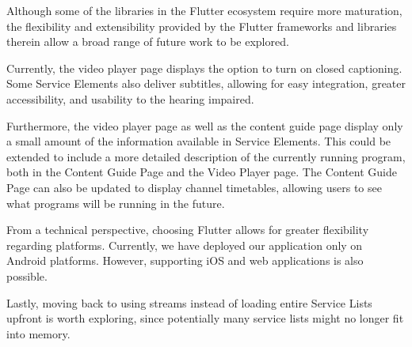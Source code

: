 \documentclass[conference]{IEEEtran}
\begin{document}
Although some of the libraries in the Flutter ecosystem require more maturation, the flexibility and extensibility provided by the Flutter frameworks and libraries therein allow a broad range of future work to be explored. \\\par
Currently, the video player page displays the option to turn on closed captioning. Some Service Elements also deliver subtitles, allowing for easy integration,  greater accessibility, and usability to the hearing impaired. \\\par
Furthermore, the video player page as well as the content guide page display only a small amount of the information available in Service Elements. This could be extended to include a more detailed description of the currently running program, both in the Content Guide Page and the Video Player page.
The Content Guide Page can also be updated to display channel timetables, allowing users to see what programs will be running in the future.
\\\par
From a technical perspective, choosing Flutter allows for greater flexibility regarding platforms. Currently, we have deployed our application only on Android platforms. However, supporting iOS and web applications is also possible. \\\par
Lastly, moving back to using streams instead of loading entire Service Lists upfront is worth exploring, since potentially many service lists might no longer fit into memory.
\end{document}
